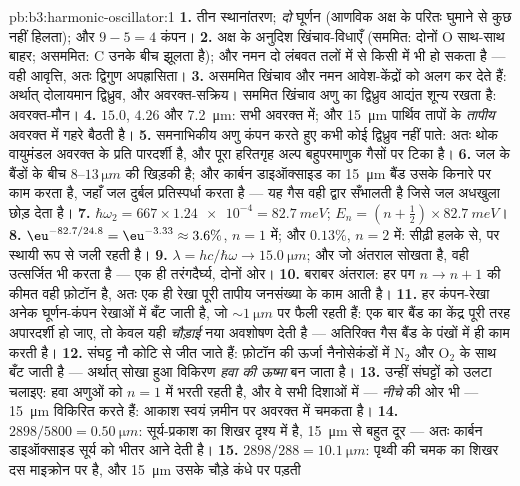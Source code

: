 \begin{solution}{pb:b3:harmonic-oscillator:1}
\textbf{1.} तीन स्थानांतरण; \emph{दो} घूर्णन (आणविक अक्ष के परितः
घुमाने से कुछ नहीं हिलता); और $9 - 5 = 4$ कंपन।
\textbf{2.} अक्ष के अनुदिश खिंचाव-विधाएँ (सममित: दोनों O साथ-साथ
बाहर; असममित: C उनके बीच झूलता है); और नमन दो लंबवत तलों में से किसी
में भी हो सकता है --- वही आवृत्ति, अतः द्विगुण अपह्रासिता।
\textbf{3.} असममित खिंचाव और नमन आवेश-केंद्रों को अलग कर देते हैं:
अर्थात् दोलायमान द्विध्रुव, और अवरक्त-सक्रिय। सममित
खिंचाव अणु का द्विध्रुव आद्यंत शून्य रखता है:
अवरक्त-मौन।
\textbf{4.} $15.0$, $4.26$ और \qty{7.2}{\micro m}: सभी अवरक्त में;
और \qty{15}{\micro m} पार्थिव तापों के \emph{तापीय} अवरक्त में
गहरे बैठती है।
\textbf{5.} समनाभिकीय अणु कंपन करते हुए कभी कोई द्विध्रुव नहीं पाते:
अतः थोक वायुमंडल अवरक्त के प्रति पारदर्शी है, और पूरा हरितगृह
अल्प बहुपरमाणुक गैसों पर टिका है।
\textbf{6.} जल के बैंडों के बीच $8$--$13\,\unit{\micro m}$ की
खिड़की है; और कार्बन डाइऑक्साइड का \qty{15}{\micro m} बैंड उसके
किनारे पर काम करता है, जहाँ जल दुर्बल प्रतिस्पर्धा करता है --- यह गैस
वही द्वार सँभालती है जिसे जल अधखुला छोड़ देता है।
\textbf{7.} $\hbar\omega_2 = 667 \times \num{1.24e-4} =
\qty{82.7}{meV}$; $E_n = (n + \tfrac12) \times \qty{82.7}{meV}$।
\textbf{8.} $\eu^{-82.7/24.8} = \eu^{-3.33} \approx 3.6\%$, $n =
1$ में; और $0.13\%$, $n = 2$ में: सीढ़ी हलके से, पर स्थायी रूप से जली रहती है।
\textbf{9.} $\lambda = hc/\hbar\omega \to \qty{15.0}{\micro m}$; और
जो अंतराल सोखता है, वही उत्सर्जित भी करता है --- एक ही
तरंगदैर्घ्य, दोनों ओर।
\textbf{10.} बराबर अंतराल: हर पग $n \to n + 1$ की कीमत वही
फ़ोटॉन है, अतः एक ही रेखा पूरी तापीय जनसंख्या के काम आती है।
\textbf{11.} हर कंपन-रेखा अनेक घूर्णन-कंपन रेखाओं में बँट जाती है,
जो $\sim\qty{1}{\micro m}$ पर फैली रहती हैं:
एक बार बैंड का केंद्र पूरी तरह अपारदर्शी हो जाए, तो केवल यही
\emph{चौड़ाई} नया अवशोषण देती है --- अतिरिक्त गैस बैंड के पंखों में ही
काम करती है।
\textbf{12.} संघट्ट नौ कोटि से जीत जाते हैं: फ़ोटॉन की ऊर्जा
नैनोसेकंडों में N$_2$ और O$_2$ के साथ बँट जाती है
--- अर्थात् सोखा हुआ विकिरण \emph{हवा की ऊष्मा} बन जाता है।
\textbf{13.} उन्हीं संघट्टों को उलटा चलाइए: हवा अणुओं को
$n = 1$ में भरती रहती है, और वे सभी दिशाओं में --- \emph{नीचे} की ओर
भी --- \qty{15}{\micro m} विकिरित करते हैं: आकाश स्वयं ज़मीन पर
अवरक्त में चमकता है।
\textbf{14.} $2898/5800 = \qty{0.50}{\micro m}$: सूर्य-प्रकाश का
शिखर दृश्य में है, \qty{15}{\micro m} से बहुत दूर --- अतः कार्बन
डाइऑक्साइड सूर्य को भीतर आने देती है।
\textbf{15.} $2898/288 = \qty{10.1}{\micro m}$: पृथ्वी की चमक का
शिखर दस माइक्रोन पर है, और \qty{15}{\micro m} उसके चौड़े कंधे पर पड़ती

\end{solution}
